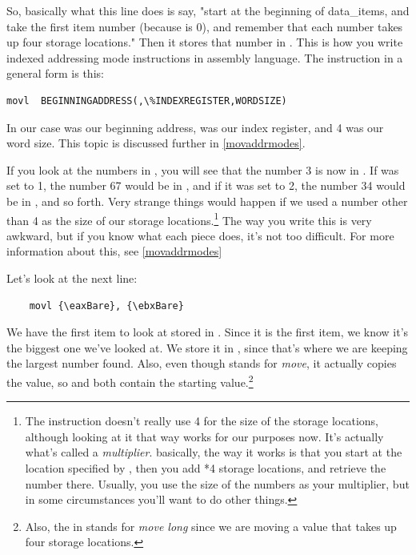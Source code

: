 So, basically what this line does is say, "start at the beginning of 
data\_items, and take the first item number (because \icode{{\ediBare}} 
is 0), and remember that each number takes up four storage locations."
Then it stores that number in \icode{{\eaxBare}}.  This is how you write
indexed addressing mode
instructions in assembly language.  The instruction in a general form
is this: 

\begin{simpletyping}
\begin{lstlisting}
movl  BEGINNINGADDRESS(,\%INDEXREGISTER,WORDSIZE)
\end{lstlisting}
\end{simpletyping}
  

In our case  was our beginning address, {\ediReg} was our
index register, and 4 was our word size.  This topic is discussed further in \autoref{movaddrmodes}.

If you look at the numbers in , you will see that the number
3 is now in {\eaxReg}.  If {\ediReg} was set 
to 1, the number 67 would be in {\eaxReg}, and if it
was set to 2, the number 34 would be in {\eaxReg}, and so
forth.  Very strange things would happen if we used a number other than
4 as the size of our storage locations.\footnote{The instruction 
doesn't really use 4 for the size of the storage locations, although 
looking at it that way works for our purposes now.  It's actually what's 
called a \emph{multiplier}.  basically, the way it works is that
you start at the location specified by , then
you add \icode{{\ediBare}}*4 storage locations, and retrieve the number
there.  Usually, you use the size of the numbers as your multiplier, but in
some circumstances you'll want to do other things.}
The way you write this is very awkward, but if you know what each piece does, 
it's not too difficult.  For more information about this, see 
\autoref{movaddrmodes}

Let's look at the next line:

\begin{simpletyping}
\begin{lstlisting}
	movl {\eaxBare}, {\ebxBare}
\end{lstlisting}
\end{simpletyping}

We have the first item to look at stored in \icode{{\eaxBare}}.  Since
it is the first item, we know it's the biggest one we've looked at.  
We store it in \icode{{\ebxBare}}, since that's where we are
keeping the largest number found.  Also, even though 
stands for \emph{move}, it actually copies the value, so
\icode{{\eaxBare}} and \icode{{\ebxBare}} both contain the
starting value.\footnote{Also, the  in 
 stands for \emph{move long} since
we are moving a value that takes up four storage locations.}


